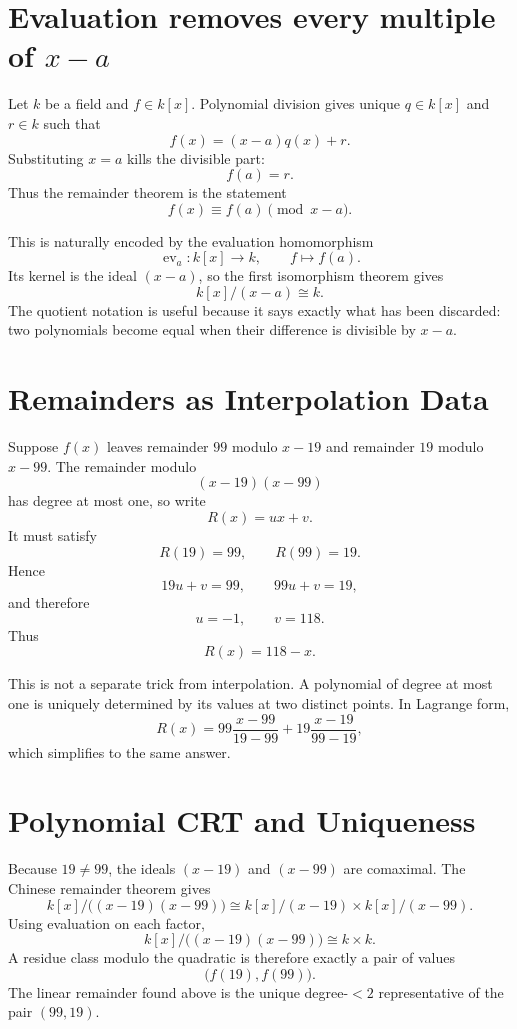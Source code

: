 \section{Evaluation removes every multiple of \texorpdfstring{$x-a$}{x-a}}

Let \(k\) be a field and \(f\in k[x]\).  Polynomial division gives unique \(q\in k[x]\) and \(r\in k\) such that
\[
  f(x)=(x-a)q(x)+r.
\]
Substituting \(x=a\) kills the divisible part:
\[
  f(a)=r.
\]
Thus the remainder theorem is the statement
\[
  f(x)\equiv f(a)\pmod{x-a}.
\]

This is naturally encoded by the evaluation homomorphism
\[
  \operatorname{ev}_a:k[x]\longrightarrow k,
  \qquad
  f\longmapsto f(a).
\]
Its kernel is the ideal \((x-a)\), so the first isomorphism theorem gives
\[
  k[x]/(x-a)\cong k.
\]
The quotient notation is useful because it says exactly what has been discarded: two polynomials become equal when their difference is divisible by \(x-a\).

\section{Remainders as Interpolation Data}

Suppose \(f(x)\) leaves remainder \(99\) modulo \(x-19\) and remainder \(19\) modulo \(x-99\).  The remainder modulo
\[
  (x-19)(x-99)
\]
has degree at most one, so write
\[
  R(x)=ux+v.
\]
It must satisfy
\[
  R(19)=99,
  \qquad
  R(99)=19.
\]
Hence
\[
  19u+v=99,
  \qquad
  99u+v=19,
\]
and therefore
\[
  u=-1,
  \qquad
  v=118.
\]
Thus
\[
  \boxed{R(x)=118-x.}
\]

This is not a separate trick from interpolation.  A polynomial of degree at most one is uniquely determined by its values at two distinct points.  In Lagrange form,
\[
  R(x)
  =99\frac{x-99}{19-99}
   +19\frac{x-19}{99-19},
\]
which simplifies to the same answer.

\section{Polynomial CRT and Uniqueness}

Because \(19\ne99\), the ideals \((x-19)\) and \((x-99)\) are comaximal.  The Chinese remainder theorem gives
\[
  k[x]/\bigl((x-19)(x-99)\bigr)
  \cong
  k[x]/(x-19)\times k[x]/(x-99).
\]
Using evaluation on each factor,
\[
  k[x]/\bigl((x-19)(x-99)\bigr)
  \cong k\times k.
\]
A residue class modulo the quadratic is therefore exactly a pair of values
\[
  \bigl(f(19),f(99)\bigr).
\]
The linear remainder found above is the unique degree-\(<2\) representative of the pair \((99,19)\).

